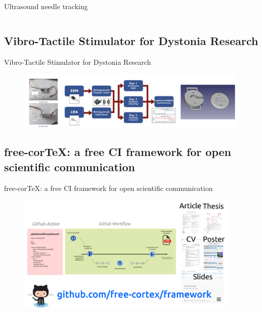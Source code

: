 {\begin{frame}{Ultrasound needle tracking}
\begin{columns}
\end{columns}

\end{frame}
}



\subsection{Vibro-Tactile Stimulator for Dystonia Research}

{
\begin{frame}{Vibro-Tactile Stimulator for Dystonia Research}

      \begin{figure}
        \centering
        \includegraphics[width=0.99\textwidth]{./figs/event-detection/versions/drawing-v00.png}
      \end{figure}

\end{frame}
}




\subsection{free-corTeX: a free CI framework for open scientific communication}
{

\begin{frame}{
free-corTeX: a free CI framework for open scientific communication
}

      \begin{figure}
        \centering
        \includegraphics[width=0.95\textwidth]{./figs/free-cortex/versions/drawing-v00.png}
      \end{figure}

\end{frame}
}


